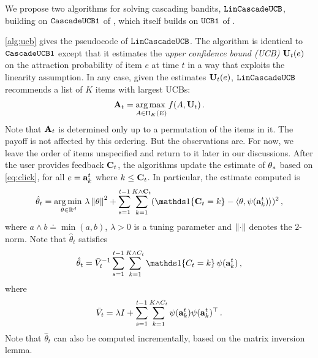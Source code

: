 We propose two algorithms for solving cascading bandits, ${\tt LinCascadeUCB}$, building on ${\tt CascadeUCB1}$ of
  \citet{kveton15cascade}, which itself builds on ${\tt UCB1}$ of \cite{auer02finitetime}.

\cref{alg:ucb} gives the pseudocode of ${\tt LinCascadeUCB}$.
The algorithm is identical to ${\tt CascadeUCB1}$ except that it estimates the
\emph{upper confidence bound (UCB)} $\mathbf{U}_t(e)$ on the attraction probability of item $e$ at time $t$
in a way that exploits the linearity assumption.
In any case, given the estimates $\mathbf{U}_t(e)$,
${\tt LinCascadeUCB}$ recommends a list of $K$ items with largest UCBs:
\begin{align}
  \mathbf{A}_t = \operatorname*{arg\,max\,}_{A \in \Pi_K(E)} f(A, \mathbf{U}_t)\,.
\end{align}
Note that $\mathbf{A}_t$ is determined only up to a permutation of the items in it. The payoff is not affected by this ordering. But the observations are. For now, we leave the order of items unspecified and return to it later in our discussions. After the user provides feedback $\mathbf{C}_t$, the algorithms update the estimate of $\theta_*$
based on \eqref{eq:click}, for all $e = \mathbf{a}^t_k$ where $k \leq \mathbf{C}_t$.
In particular, the estimate computed is
\begin{align}
\label{eq:ridge}
\hat{\rnd{\theta}}_t = \argmin_{\theta\in \R^d}
\lambda \norm{\theta}^2 +
 \sum_{s=1}^{t-1} \sum_{k=1}^{K\wedge \rnd{C}_t} ( \I{\rnd{C}_t = k} - \ip{\theta,\psi(\rnd{a}^t_k)})^2 \,,
\end{align}
where $a\wedge b \doteq \min(a,b)$, $\lambda>0$ is a tuning parameter and $\left\|\cdot\right\|$ denotes the $2$-norm.
Note that $\hat{\theta}_t$ satisfies
\begin{align*}
  \hat{\rnd{\theta}}_t = \bar{V}_t^{-1} \sum_{s=1}^{t-1} \sum_{k=1}^{K \wedge C_t}
  \one{C_t=k} \psi(\rnd{a}^t_k)\,,
\end{align*}
where
\[
\bar{V}_t = \lambda I + \sum_{s=1}^{t-1} \sum_{k=1}^{K \wedge C_t}
\psi(\mathbf{a}^t_k) \psi(\mathbf{a}^t_k)^\top\,.
\]
Note that $\hat{\theta}_t$ can also be computed incrementally, based on the matrix inversion lemma. 

